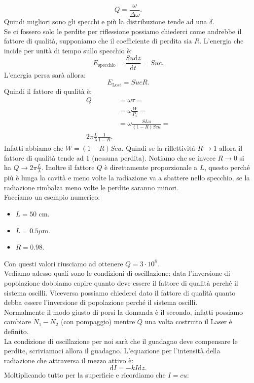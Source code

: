 \[
Q = \frac{\omega}{\Delta\omega}
.\] 
Quindi migliori sono gli specchi e più la distribuzione tende ad una $\delta$.\\
Se ci fossero solo le perdite per riflessione possiamo chiederci come andrebbe il fattore di qualità, supponiamo che il coefficiente di perdita sia $R$.
L'energia che incide per unità di tempo sullo specchio è:
\[
E_\text{specchio} = \frac{Su\text{d}z}{\text{d}t} = Suc
.\] 
L'energia persa sarà allora:
\[
E_\text{Lost} = SucR
.\] 
Quindi il fattore di qualità è:
\[\begin{aligned}
    Q &= \omega\tau = \\
      &= \omega  \frac{W}{P_u} =\\
      &=\omega\frac{SLu}{\left(1-R\right)Scu} =\\
      2\pi \frac{L}{\lambda } \frac{1}{1-R}
.\end{aligned}\]
Infatti abbiamo che $W= \left(1-R\right)Scu$. Quindi se la riflettività $R\to 1$ allora il fattore di qualità tende ad 1 (nessuna perdita).
Notiamo che se invece $R\to 0$ si ha $Q\to 2\pi \frac{L}{\lambda}$. Inoltre il fattore $Q$ è direttamente proporzionale a $L$, questo perché più è lunga la cavità e meno volte la radiazione va a sbattere nello specchio, se la radiazione rimbalza meno volte le perdite saranno minori.\\
Facciamo un esempio numerico:
\begin{itemize}
    \item $L=50$ cm.
    \item $L = 0.5 \mu$m.
    \item $R = 0.98$. 
\end{itemize}
Con questi valori riusciamo ad ottenere $Q = 3\cdot 10^8$.\\
Vediamo adesso quali sono le condizioni di oscillazione: data l'inversione di popolazione dobbiamo capire quanto deve essere il fattore di qualità perché il sistema oscilli. Viceversa possiamo chiederci dato il fattore di qualità quanto debba essere l'inversione di popolazione perché il sistema oscilli. \\
Normalmente il modo giusto di porsi la domanda è il secondo, infatti possiamo cambiare $N_1-N_2$ (con pompaggio) mentre $Q$ una volta costruito il Laser è definito.\\
La condizione di oscillazione per noi sarà che il guadagno deve compensare le perdite, scriviamoci allora il guadagno. L'equazione per l'intensità della radiazione che attraversa il mezzo attivo è:
\[
\text{d}I= -kI\text{d}z
.\] 
Moltiplicando tutto per la superficie e ricordiamo che $I=cu$:
